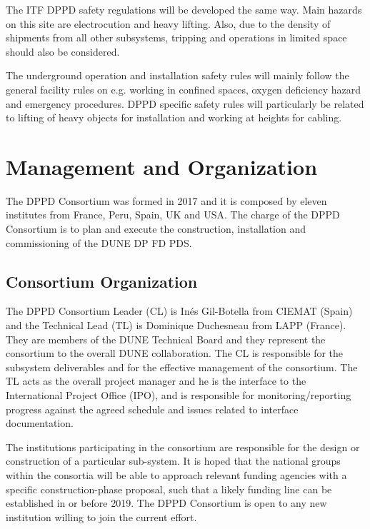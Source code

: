 The ITF DPPD safety regulations will be developed the same way. Main hazards on this site are electrocution and heavy lifting. Also, due to the density of shipments from all other subsystems, tripping and operations in limited space should also be considered.

The underground operation and installation safety rules will mainly follow the general facility rules on e.g. working in confined spaces, oxygen deficiency hazard and emergency procedures. DPPD specific safety rules will particularly be related to lifting of heavy objects for installation and working at heights for cabling.

\section{Management and Organization}
\label{sec:fddp-pd-12}

The DPPD Consortium was formed in 2017 and it is composed by eleven institutes from France, Peru, Spain, UK and USA. The charge of the DPPD Consortium is to plan and execute the construction, installation and commissioning of the DUNE DP FD PDS.


\subsection{Consortium Organization}
\label{sec:fddp-pd-12.1}

The DPPD Consortium Leader (CL) is In\'{e}s Gil-Botella from CIEMAT (Spain) and the Technical Lead (TL) is Dominique Duchesneau from LAPP (France). They are members of the DUNE Technical Board and they represent the consortium to the overall DUNE collaboration. The CL is responsible for the subsystem deliverables and for the effective management of the consortium. The TL acts as the overall project manager and he is the interface to the International Project Office (IPO), and is responsible for monitoring/reporting progress against the agreed schedule and issues related to interface documentation.

The institutions participating in the consortium are responsible for the design or construction of a particular sub-system. It is hoped that the national groups within the consortia will be able to approach relevant funding agencies with a specific construction-phase proposal, such that a likely funding line can be established in or before 2019. The DPPD Consortium is open to any new institution willing to join the current effort.

